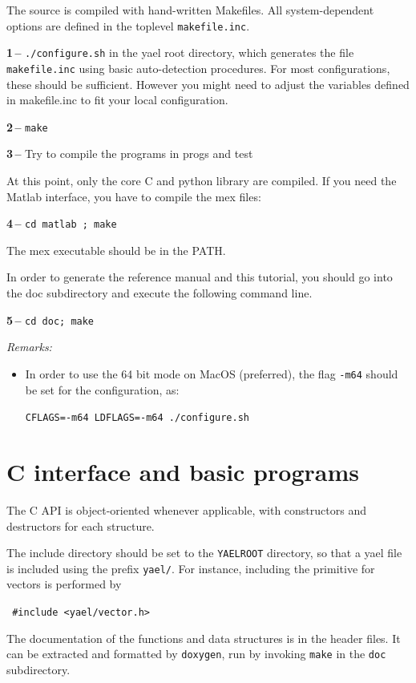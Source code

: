 \documentclass[a4paper,11pt,notitlepage,final,twoside]{report}
\newcommand{\yroot}{\texttt{YAELROOT}\xspace}
\newcommand{\tc}[1]{\texttt{#1}}
\newcommand{\code}[1]{\smallskip 

\texttt{#1} 
 \medskip

}
\begin{document}
The source is compiled with hand-written Makefiles. 
All system-dependent options are defined in the toplevel \tc{makefile.inc}. 
\bigskip

{\bf 1\,--} \tc{./configure.sh} in the yael root directory, which generates 
the file \tc{makefile.inc} using basic auto-detection procedures. 
For most configurations, these should be sufficient. However you might need 
to adjust the variables defined in makefile.inc to fit your local configuration. 
\bigskip

{\bf 2\,--} \tc{make}
\bigskip

{\bf 3\,--} Try to compile the programs in progs and test
\medskip

At this point, only the core C and python library are compiled. 
If you need the Matlab interface, you have to compile the mex files:
\bigskip

{\bf 4\,--} \tc{cd matlab ; make}
\smallskip

The mex executable should be in the PATH. 
\bigskip

In order to generate the reference manual and this tutorial, you should go into the 
doc subdirectory and execute the following command line. 
\smallskip

{\bf 5\,--} \tc{cd doc; make}
\bigskip

{\it Remarks:}
\begin{itemize}
\item In order to use the 64 bit mode on MacOS (preferred), 
the flag \tc{-m64} should be set for the configuration, as:
\code{CFLAGS=-m64 LDFLAGS=-m64 ./configure.sh}
\end{itemize}


\chapter{C interface and basic programs}

The C API is object-oriented whenever applicable, with constructors and destructors for each structure. 
\medskip

The include directory should be set to the \yroot directory, so that a yael file is included using the prefix \texttt{yael/}. 
For instance, including the primitive for vectors is performed by
\code{
\#include <yael/vector.h>
}
\medskip

The documentation of the functions and data structures is in the header files. It can be extracted and formatted by \texttt{doxygen}, run by invoking \texttt{make} in the \texttt{doc} subdirectory. 
\medskip
\end{document}
